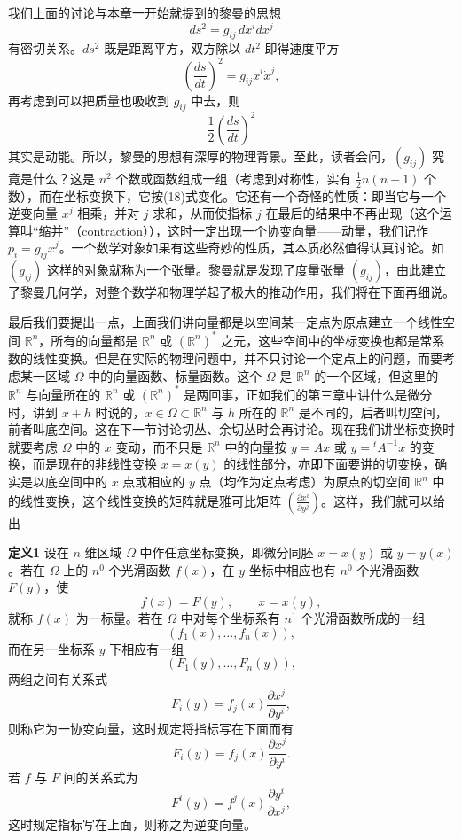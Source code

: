 我们上面的讨论与本章一开始就提到的黎曼的思想
\[
 ds^2=g_{ij}\,dx^i dx^j
\]
有密切关系。$ds^2$ 既是距离平方，双方除以 $dt^2$ 即得速度平方
\[
 \left(\frac{ds}{dt}\right)^2=g_{ij}\dot x^i\dot x^j,
\]
再考虑到可以把质量也吸收到 $g_{ij}$ 中去，则
\[
 \frac12\left(\frac{ds}{dt}\right)^2
\]
其实是动能。所以，黎曼的思想有深厚的物理背景。至此，读者会问，$(g_{ij})$ 究竟是什么？这是 $n^2$ 个数或函数组成一组（考虑到对称性，实有 $\frac12n(n+1)$ 个数），而在坐标变换下，它按(18)式变化。它还有一个奇怪的性质：即当它与一个逆变向量 $x^j$ 相乘，并对 $j$ 求和，从而使指标 $j$ 在最后的结果中不再出现（这个运算叫“缩并”（contraction）），这时一定出现一个协变向量——动量，我们记作 $p_i=g_{ij}\dot x^j$。一个数学对象如果有这些奇妙的性质，其本质必然值得认真讨论。如 $(g_{ij})$ 这样的对象就称为一个张量。黎曼就是发现了度量张量 $(g_{ij})$，由此建立了黎曼几何学，对整个数学和物理学起了极大的推动作用，我们将在下面再细说。

最后我们要提出一点，上面我们讲向量都是以空间某一定点为原点建立一个线性空间 $\mathbb R^n$，所有的向量都是 $\mathbb R^n$ 或 $(\mathbb R^n)^*$ 之元，这些空间中的坐标变换也都是常系数的线性变换。但是在实际的物理问题中，并不只讨论一个定点上的问题，而要考虑某一区域 $\Omega$ 中的向量函数、标量函数。这个 $\Omega$ 是 $\mathbb R^n$ 的一个区域，但这里的 $\mathbb R^n$ 与向量所在的 $\mathbb R^n$ 或 $(\mathbb R^n)^*$ 是两回事，正如我们的第三章中讲什么是微分时，讲到 $x+h$ 时说的，$x\in\Omega\subset\mathbb R^n$ 与 $h$ 所在的 $\mathbb R^n$ 是不同的，后者叫切空间，前者叫底空间。这在下一节讨论切丛、余切丛时会再讨论。现在我们讲坐标变换时就要考虑 $\Omega$ 中的 $x$ 变动，而不只是 $\mathbb R^n$ 中的向量按 $y=Ax$ 或 $y={}^t\!A^{-1}x$ 的变换，而是现在的非线性变换 $x=x(y)$ 的线性部分，亦即下面要讲的切变换，确实是以底空间中的 $x$ 点或相应的 $y$ 点（均作为定点考虑）为原点的切空间 $\mathbb R^n$ 中的线性变换，这个线性变换的矩阵就是雅可比矩阵 $\left(\frac{\partial x^i}{\partial y^j}\right)$。这样，我们就可以给出

\noindent\textbf{定义1}\quad
设在 $n$ 维区域 $\Omega$ 中作任意坐标变换，即微分同胚 $x=x(y)$ 或 $y=y(x)$。若在 $\Omega$ 上的 $n^0$ 个光滑函数 $f(x)$，在 $y$ 坐标中相应也有 $n^0$ 个光滑函数 $F(y)$，使
\begin{equation}
 f(x)=F(y),\qquad x=x(y),
 \tag{21}
\end{equation}
就称 $f(x)$ 为一标量。若在 $\Omega$ 中对每个坐标系有 $n^1$ 个光滑函数所成的一组
\[
 (f_1(x),\ldots,f_n(x)),
\]
而在另一坐标系 $y$ 下相应有一组
\[
 (F_1(y),\ldots,F_n(y)),
\]
两组之间有关系式
\begin{equation}
 F_i(y)=f_j(x)\frac{\partial x^j}{\partial y^i},
 \tag{22}
\end{equation}
则称它为一协变向量，这时规定将指标写在下面而有
\[
 F_i(y)=f_j(x)\frac{\partial x^j}{\partial y^i}.
\]
若 $f$ 与 $F$ 间的关系式为
\[
 F^i(y)=f^j(x)\frac{\partial y^i}{\partial x^j},
\]
这时规定指标写在上面，则称之为逆变向量。

